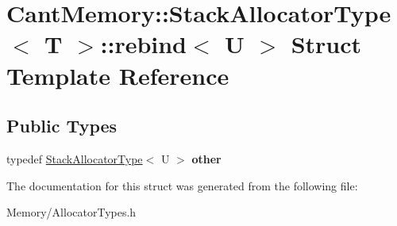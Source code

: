 \hypertarget{structCantMemory_1_1StackAllocatorType_1_1rebind}{}\section{Cant\+Memory\+:\+:Stack\+Allocator\+Type$<$ T $>$\+:\+:rebind$<$ U $>$ Struct Template Reference}
\label{structCantMemory_1_1StackAllocatorType_1_1rebind}
\subsection*{Public Types}
\begin{DoxyCompactItemize}
\item 
\mbox{\label{structCantMemory_1_1StackAllocatorType_1_1rebind_a00fa6751e06adb06b5962ecc908c54d0}} 
typedef \hyperlink{classCantMemory_1_1StackAllocatorType}{Stack\+Allocator\+Type}$<$ U $>$ {\bfseries other}
\end{DoxyCompactItemize}


The documentation for this struct was generated from the following file\+:\begin{DoxyCompactItemize}
\item 
Memory/Allocator\+Types.\+h\end{DoxyCompactItemize}
